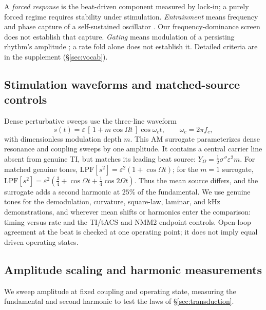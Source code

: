 \documentclass[11pt,a4paper]{article}
\newcommand{\Sig}{\sigma}
\newcommand{\half}{\tfrac{1}{2}}
\begin{document}
\label{sec:vocab-methods}
A \emph{forced response} is the beat-driven component measured by lock-in; a purely
forced regime requires stability under stimulation. \emph{Entrainment} means
frequency and phase capture of a self-sustained oscillator \cite{pikovsky2001}.
Our frequency-dominance screen does not establish that capture. \emph{Gating}
means modulation of a persisting rhythm's amplitude \cite{canolty2010,tort2010};
a rate fold alone does not establish it. Detailed criteria are in the supplement
(\S\ref{sec:vocab}).

\subsection{Stimulation waveforms and matched-source controls}\label{sec:waveforms}
Dense perturbative sweeps use the
three-line waveform
\begin{equation}
s(t)=\varepsilon\,[\,1+m\cos\Omega t\,]\cos\omega_c t,\qquad \omega_c=2\pi f_c ,
\label{eq:amsur}
\end{equation}
with dimensionless modulation depth $m$. This AM surrogate parameterizes dense
resonance and coupling sweeps by one amplitude. It contains a central carrier
line absent from genuine TI, but matches its leading beat source:
$Y_\Omega=\half\Sig''\varepsilon^2m$. For matched genuine tones,
$\mathrm{LPF}[s^2]=\varepsilon^2(1+\cos\Omega t)$; for the $m=1$ surrogate,
$\mathrm{LPF}[s^2]=\varepsilon^2(\tfrac34+\cos\Omega t+\tfrac14\cos2\Omega t)$.
Thus the mean source differs, and the surrogate adds a second harmonic at
$25\%$ of the fundamental. We use genuine tones for the demodulation,
curvature, square-law, laminar, and kHz demonstrations, and wherever mean shifts
or harmonics enter the comparison: timing versus rate and the TI/tACS and
NMM2 endpoint controls. Open-loop agreement at the beat is checked at one
operating point; it does not imply equal driven operating states.

\subsection{Amplitude scaling and harmonic measurements}\label{sec:transduction-methods}
We sweep amplitude at fixed coupling and operating state, measuring the
fundamental and second harmonic to test the laws of \S\ref{sec:transduction}.
\end{document}
